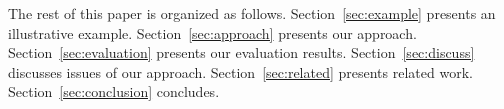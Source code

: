 The rest of this paper is organized as follows.
Section~\ref{sec:example} presents an illustrative example.
Section~\ref{sec:approach} presents our approach.
Section~\ref{sec:evaluation} presents our evaluation results.
Section~\ref{sec:discuss} discusses issues of our approach.
Section~\ref{sec:related} presents related work.
Section~\ref{sec:conclusion} concludes.



